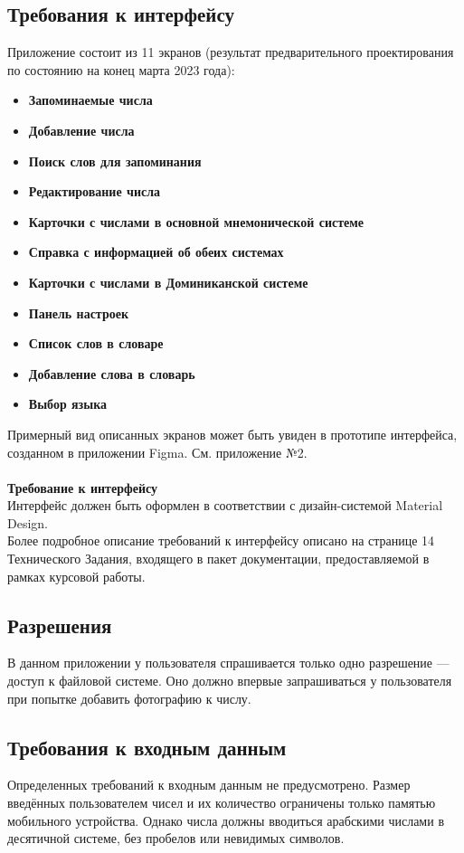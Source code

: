 \documentclass[draft]{article}
\begin{document}
\subsection{Требования к интерфейсу}
Приложение состоит из 11 экранов (результат предварительного проектирования по состоянию на конец марта 2023 года):
\begin{itemize}
\item \textbf{Запоминаемые числа}
\item \textbf{Добавление числа}
\item \textbf{Поиск слов для запоминания}
\item \textbf{Редактирование числа}
\item \textbf{Карточки с числами в основной мнемонической системе}
\item \textbf{Справка с информацией об обеих системах}
\item \textbf{Карточки с числами в Доминиканской системе}
\item \textbf{Панель настроек}
\item \textbf{Список слов в словаре}
\item \textbf{Добавление слова в словарь}
\item \textbf{Выбор языка}
\end{itemize}
Примерный вид описанных экранов может быть увиден в прототипе интерфейса, созданном в приложении Figma. См. приложение №2.\\
~\\
\textbf{Требование к интерфейсу}\\
Интерфейс должен быть оформлен в соответствии с дизайн-системой Material Design.\\
Более подробное описание требований к интерфейсу описано на странице 14 Технического Задания, входящего в пакет документации, предоставляемой в рамках курсовой работы.
\subsection{Разрешения}
В данном приложении у пользователя спрашивается только одно разрешение — доступ к файловой системе. Оно должно впервые запрашиваться у пользователя при попытке добавить фотографию к числу.
\subsection{Требования к входным данным}
Определенных требований к входным данным не предусмотрено. Размер введённых пользователем чисел и их количество ограничены только памятью мобильного устройства. Однако числа должны вводиться арабскими числами в десятичной системе, без пробелов или невидимых символов.
\end{document}
